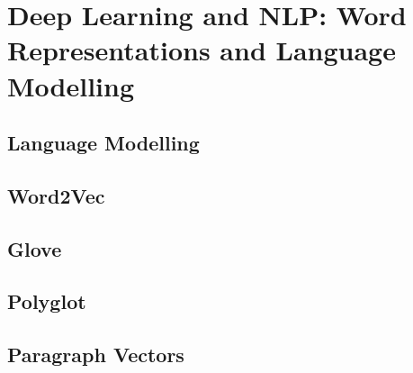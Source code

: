 \chapter{Deep Learning and NLP: Word Representations and Language Modelling}\label{chapter:deepnlp}

\section{Language Modelling}
\section{Word2Vec}
\section{Glove}
\section{Polyglot}
\section{Paragraph Vectors}